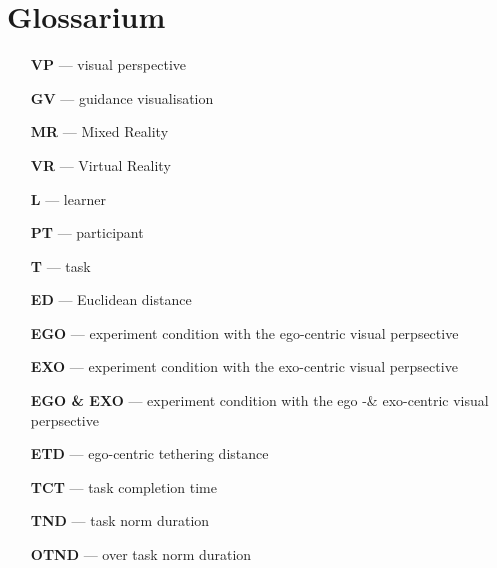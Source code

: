 \chapter{Glossarium}
\begin{itemize}
	\item[\textbf{VP}] --- visual perspective
	\item[\textbf{GV}] --- guidance visualisation 
	\item[\textbf{MR}] --- Mixed Reality
	\item[\textbf{VR}] --- Virtual Reality 
	\item[\textbf{L}] --- learner
	\item[\textbf{PT}] --- participant
	\item[\textbf{T}] --- task
	\item[\textbf{ED}] --- Euclidean distance
	\item[\textbf{EGO}] --- experiment condition with the ego-centric visual perpsective 
	\item[\textbf{EXO}] --- experiment condition with the exo-centric visual perpsective 
	\item[\textbf{EGO \& EXO}] --- experiment condition with the ego -\& exo-centric visual perpsective 
	\item[\textbf{ETD}] --- ego-centric tethering distance
	\item[\textbf{TCT}] --- task completion time
	\item[\textbf{TND}] --- task norm duration
	\item[\textbf{OTND}] --- over task norm duration
\end{itemize}